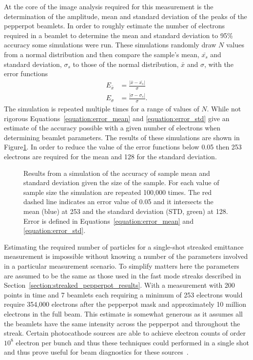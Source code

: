 At the core of the image analysis required for this measurement is the determination of the amplitude, mean and standard deviation of the peaks of the pepperpot beamlets.
In order to roughly estimate the number of electrons required in a beamlet to determine the mean and standard deviation to 95\% accuracy some simulations were run.
These simulations randomly draw $N$ values from a normal distribution and then compare the sample's mean, $\bar{x_s}$ and standard deviation, $\sigma_s$ to those of the normal distribution, $\bar{x}$ and $\sigma$, with the error functions
\begin{align}
E_{\bar{x}} &= \frac{\left|\bar{x} - \bar{x_s}\right|}{\sigma}\label{equation:error_mean}\\
E_{\sigma} &= \frac{\left|\sigma - \sigma_s\right|}{\sigma}.\label{equation:error_std}
\end{align}
The simulation is repeated multiple times for a range of values of $N$.
While not rigorous Equations~\ref{equation:error_mean} and \ref{equation:error_std} give an estimate of the accuracy possible with a given number of electrons when determining beamlet parameters.
The results of these simulations are shown in Figure\ref{figure:gaussian_simulation}.
In order to reduce the value of the error functions below 0.05 then 253 electrons are required for the mean and 128 for the standard deviation.

\begin{figure}
    \center
    
    \caption{Results from a simulation of the accuracy of sample mean and standard deviation given the size of the sample. For each value of sample size the simulation are repeated 100,000 times. The red dashed line indicates an error value of 0.05 and it intersects the mean (blue) at 253 and the standard deviation (STD, green) at 128. Error is defined in Equations~\ref{equation:error_mean} and \ref{equation:error_std}.}
    \label{figure:gaussian_simulation}
\end{figure}

Estimating the required number of particles for a single-shot streaked emittance measurement is impossible without knowing a number of the parameters involved in a particular measurement scenario.
To simplify matters here the parameters are assumed to be the same as those used in the fast mode streaks described in Section~\ref{section:streaked_pepperpot_results}.
With a measurement with 200 points in time and 7 beamlets each requiring a minimum of 253 electrons would require 354,000 electrons after the pepperpot mask and approximately 10 million electrons in the full beam.
This estimate is somewhat generous as it assumes all the beamlets have the same intensity across the pepperpot and throughout the streak.
Certain photocathode sources are able to achieve electron counts of order $10^8$ electron per bunch and thus these techniques could performed in a single shot and thus prove useful for beam diagnostics for these sources~\cite{li_note:_2010,musumeci_high_2010}.

